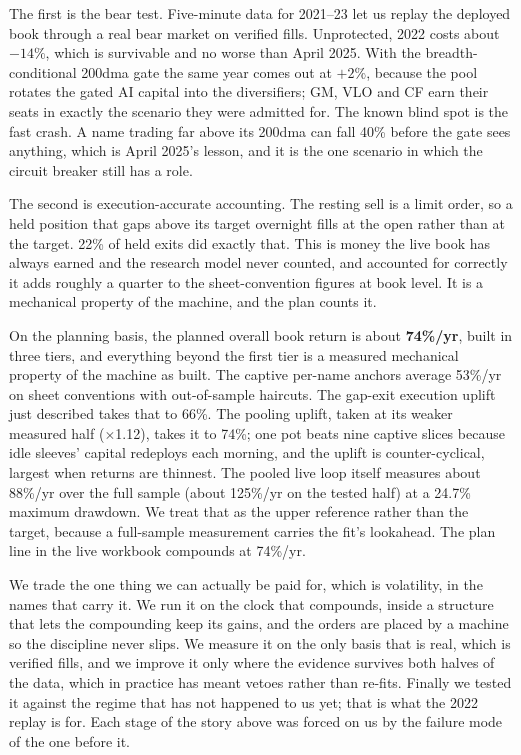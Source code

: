 \documentclass[11pt,a4paper]{article}
\begin{document}
The first is the bear test. Five-minute data for 2021--23 let us replay the
deployed book through a real bear market on verified fills. Unprotected,
2022 costs about $-14\%$, which is survivable and no worse than April 2025.
With the breadth-conditional 200dma gate the same year comes out at $+2\%$,
because the pool rotates the gated AI capital into the diversifiers; GM,
VLO and CF earn their seats in exactly the scenario they were admitted for.
The known blind spot is the fast crash. A name trading far above its 200dma
can fall 40\% before the gate sees anything, which is April 2025's lesson,
and it is the one scenario in which the circuit breaker still has a role.

The second is execution-accurate accounting. The resting sell is a limit
order, so a held position that gaps above its target overnight fills at the
open rather than at the target. 22\% of held exits did exactly that. This is
money the live book has always earned and the research model never counted,
and accounted for correctly it adds roughly a quarter to the
sheet-convention figures at book level. It is a mechanical property of the
machine, and the plan counts it.

On the planning basis, the planned overall book return is about
\textbf{74\%/yr}, built in three tiers, and everything beyond the first tier
is a measured mechanical property of the machine as built. The captive
per-name anchors average 53\%/yr on sheet conventions with out-of-sample
haircuts. The gap-exit execution uplift just described takes that to 66\%.
The pooling uplift, taken at its weaker measured half ($\times$1.12), takes
it to 74\%; one pot beats nine captive slices because idle sleeves' capital
redeploys each morning, and the uplift is counter-cyclical, largest when
returns are thinnest. The pooled live loop itself measures about 88\%/yr
over the full sample (about 125\%/yr on the tested half) at a 24.7\% maximum
drawdown. We treat that as the upper reference rather than the target,
because a full-sample measurement carries the fit's lookahead. The plan line
in the live workbook compounds at 74\%/yr.

\begin{tcolorbox}[colback=bcgold!8, colframe=bcgold, boxrule=0.8pt,
  title={\bfseries The whole argument}, coltitle=bcnavy]
We trade the one thing we can actually be paid for, which is volatility, in
the names that carry it. We run it on the clock that compounds, inside a
structure that lets the compounding keep its gains, and the orders are
placed by a machine so the discipline never slips. We measure it on the only
basis that is real, which is verified fills, and we improve it only where
the evidence survives both halves of the data, which in practice has meant
vetoes rather than re-fits. Finally we tested it against the regime that
has not happened to us yet; that is what the 2022 replay is for. Each stage
of the story above was forced on us by the failure mode of the one before
it.
\end{tcolorbox}
\end{document}
